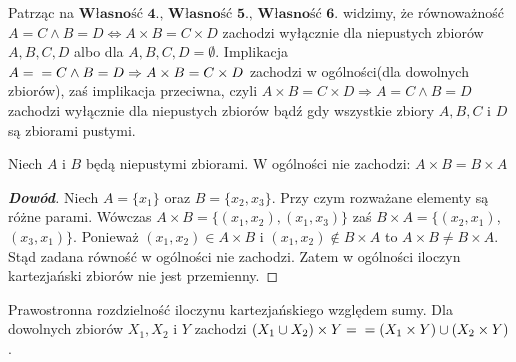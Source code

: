 \begin{remark}
Patrząc na $\textbf{Własność 4., Własność 5., Własność 6.}$ widzimy, że równoważność $A=C\wedge B=D\Leftrightarrow A\times B=C\times D$ zachodzi wyłącznie dla niepustych zbiorów $A,B,C, D$ albo dla $A,B,C,D=\emptyset$. Implikacja $A=\\=C\wedge B=D\Rightarrow A\times B=C\times D$ zachodzi w ogólności(dla dowolnych zbiorów), zaś implikacja przeciwna, czyli $A\times B=C\times D\Rightarrow A=C\wedge B=D$ zachodzi wyłącznie dla niepustych zbiorów bądź gdy wszystkie zbiory $A,B,C$ i $D$ są zbiorami pustymi.
\end{remark}
\begin{property}
Niech $A$ i $B$ będą niepustymi zbiorami. W ogólności nie zachodzi: 
$A\times B=B\times A$
\end{property}
\begin{proof}[\textbf{Dowód}]
Niech $A=\{x_{1}\}$ oraz $B=\{x_{2},x_{3}\}$. Przy czym rozważane elementy są różne parami. Wówczas $A\times B=\{(x_{1},x_{2}),(x_{1},x_{3})\}$ zaś $B\times A=\{(x_{2},x_{1})$, $(x_{3},x_{1})\}$. Ponieważ $(x_{1},x_{2})\in A\times B$ i $(x_{1},x_{2})\notin B\times A$ to $A\times B\ne B\times A$. Stąd zadana równość w ogólności nie zachodzi. Zatem w ogólności iloczyn kartezjański zbiorów nie jest przemienny.
\end{proof}
\begin{property}
Prawostronna rozdzielność iloczynu kartezjańskiego względem sumy.
Dla dowolnych zbiorów $X_{1},X_{2}$ i $Y$ zachodzi $(X_{1}\cup X_{2})\times Y=\\=(X_{1}\times Y)\cup(X_{2}\times Y)$.
\end{property}

